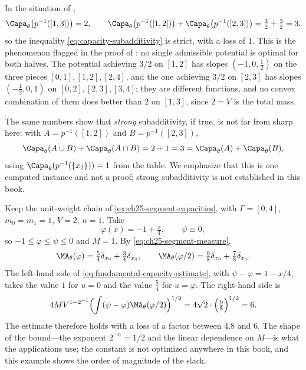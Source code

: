 \begin{example}
\label{ex:ch25-subadditivity-strict}
In the situation of ,
\[
 \Capa_\theta\bigl(p^{-1}([1,3])\bigr)=2,
 \qquad
 \Capa_\theta\bigl(p^{-1}([1,2])\bigr)
 +\Capa_\theta\bigl(p^{-1}([2,3])\bigr)=\tfrac32+\tfrac32=3 ,
\]
so the inequality \eqref{eq:capacity-subadditivity} is strict, with a loss of
\(1\).  This is the phenomenon flagged in the proof of
: no single admissible potential is optimal
for both halves.  The potential achieving \(3/2\) on \([1,2]\) has slopes
\((-1,0,\tfrac12)\) on the three pieces \([0,1],[1,2],[2,4]\), and the one
achieving \(3/2\) on \([2,3]\) has slopes
\((-\tfrac12,0,1)\) on \([0,2],[2,3],[3,4]\); they are different functions,
and no convex combination of them does better than \(2\) on \([1,3]\), since
\(2=V\) is the total mass.

The same numbers show that \emph{strong} subadditivity, if true, is not far
from sharp here: with \(A=p^{-1}([1,2])\) and \(B=p^{-1}([2,3])\),
\[
 \Capa_\theta(A\cup B)+\Capa_\theta(A\cap B)=2+1=3
 =\Capa_\theta(A)+\Capa_\theta(B),
\]
using \(\Capa_\theta(p^{-1}(\{x_2\}))=1\) from the table.  We emphasize that
this is one computed instance and not a proof; strong subadditivity is not
established in this book.
\end{example}

\begin{example}
\label{ex:ch25-fundamental-numbers}
Keep the unit-weight chain of \cref{ex:ch25-segment-capacities},
with \(\Gamma=[0,4]\), \(m_0=m_1=1\), \(V=2\), \(n=1\).  Take
\[
 \varphi(x)=-1+\tfrac x4,\qquad \psi\equiv0,
\]
so \(-1\leq\varphi\leq\psi\leq0\) and \(M=1\).  By
\eqref{eq:ch25-segment-measure},
\[
 \MA_\theta(\varphi)=\tfrac54\delta_{x_0}+\tfrac34\delta_{x_4},
 \qquad
 \MA_\theta(\varphi/2)=\tfrac98\delta_{x_0}+\tfrac78\delta_{x_4}.
\]
The left-hand side of \eqref{eq:fundamental-capacity-estimate}, with
\(\psi-\varphi=1-x/4\), takes the value \(1\) for \(u=0\) and the value
\(\tfrac54\) for \(u=\varphi\).  The right-hand side is
\[
 4MV^{1-2^{-1}}\Bigl(\int(\psi-\varphi)\MA_\theta(\varphi/2)\Bigr)^{1/2}
 =4\sqrt2\cdot\Bigl(\tfrac98\Bigr)^{1/2}=6 .
\]
The estimate therefore holds with a loss of a factor between \(4.8\) and
\(6\).  The shape of the bound---the exponent \(2^{-n}=1/2\) and the linear
dependence on \(M\)---is what the applications use; the constant is not
optimized anywhere in this book, and this example shows the order of
magnitude of the slack.
\end{example}

